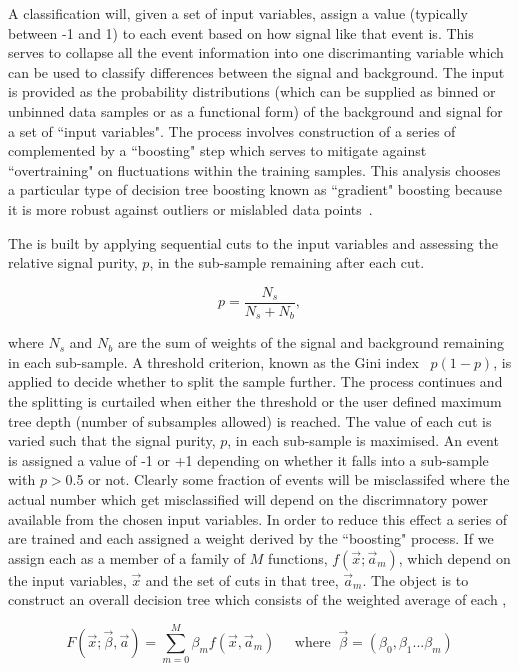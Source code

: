A classification \BDT will, given a set of input variables, assign a value (typically between -1 and 1) to each event based on how signal like that event is. This serves to collapse all the event information into one discrimanting variable which can be used to classify differences between the signal and background. The input is provided as the probability distributions (which can be supplied as binned or unbinned data samples or as a functional form) of the background and signal for a set of ``input variables". The process involves construction of a series of \DTs complemented by a ``boosting" step which serves to mitigate against ``overtraining" on fluctuations within the training samples. This analysis chooses a particular type of decision tree boosting known as ``gradient" boosting because it is more robust against outliers or mislabled data points~\cite{TMVA}.

The \DT is built by applying sequential cuts to the input variables and assessing the relative signal purity, $p$, in the sub-sample remaining after each cut.

\begin{equation}
  p = \frac{N_{s}}{N_{s}+N_{b}},
\end{equation}

where $N_{s}$ and $N_{b}$ are the sum of weights of the signal and background remaining in each sub-sample. A threshold criterion, known as the Gini index~\cite{TMVA} $p(1-p)$, is applied to decide whether to split the sample further. The process continues and the splitting is curtailed when either the threshold or the user defined maximum tree depth (number of subsamples allowed) is reached. The value of each cut is varied such that the signal purity, $p$, in each sub-sample is maximised. An event is assigned a value of -1 or +1 depending on whether it falls into a sub-sample with $p>$0.5 or not. Clearly some fraction of events will be misclassifed where the actual number which get misclassified will depend on the discrimnatory power available from the chosen input variables. In order to reduce this effect a series of \DTs are trained and each assigned a weight derived by the ``boosting" process. 
If we assign each \DT as a member of a family of $M$ functions, $f(\vec{x};\vec{a}_{m})$, which depend on the input variables, $\vec{x}$ and the set of cuts in that tree, $\vec{a}_{m}$. The object is to construct an overall decision tree which consists of the weighted average of each \DT,

\begin{equation}
  F(\vec{x};\vec{\beta},\vec{a}) = \sum_{m=0}^{M} \beta_{m}f(\vec{x},\vec{a}_{m}) \;\;\;\;\; \textrm{where} \;\; \vec{\beta} = (\beta_{0},\beta_{1}...\beta_{m})
\end{equation}

